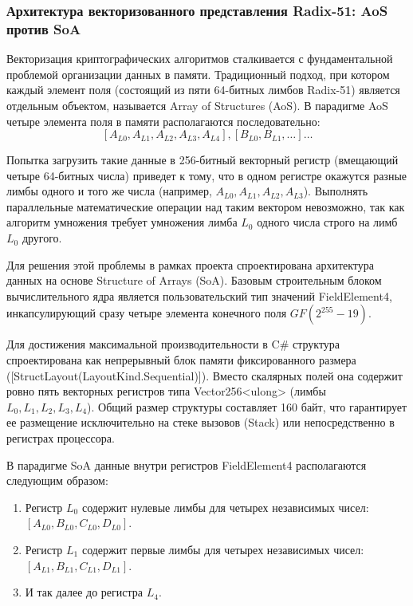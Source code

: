 \subsubsection{Архитектура векторизованного представления Radix-51: AoS против SoA}

Векторизация криптографических алгоритмов сталкивается с фундаментальной проблемой организации данных в памяти. 
Традиционный подход, при котором каждый элемент поля (состоящий из пяти 64-битных лимбов Radix-51) является отдельным объектом, называется Array of Structures (AoS). В парадигме AoS четыре элемента поля в памяти располагаются последовательно:
$$[A_{L0}, A_{L1}, A_{L2}, A_{L3}, A_{L4}], [B_{L0}, B_{L1}, \dots] \dots $$

Попытка загрузить такие данные в 256-битный векторный регистр (вмещающий четыре 64-битных числа) приведет к тому, что в одном регистре окажутся разные лимбы одного и того же числа (например, $A_{L0}, A_{L1}, A_{L2}, A_{L3}$). Выполнять параллельные математические операции над таким вектором невозможно, так как алгоритм умножения требует умножения лимба $L_0$ одного числа строго на лимб $L_0$ другого.

Для решения этой проблемы в рамках проекта спроектирована архитектура данных на основе Structure of Arrays (SoA). Базовым строительным блоком вычислительного ядра является пользовательский тип значений FieldElement4, инкапсулирующий сразу четыре элемента конечного поля $GF(2^{255}-19)$.

Для достижения максимальной производительности в C\# структура спроектирована как непрерывный блок памяти фиксированного размера ([StructLayout(LayoutKind.Sequential)]). Вместо скалярных полей она содержит ровно пять векторных регистров типа Vector256<ulong> (лимбы $L_0, L_1, L_2, L_3, L_4$). Общий размер структуры составляет 160 байт, что гарантирует ее размещение исключительно на стеке вызовов (Stack) или непосредственно в регистрах процессора.

В парадигме SoA данные внутри регистров FieldElement4 располагаются следующим образом:
\begin{enumerate}
    \item Регистр $L_0$ содержит нулевые лимбы для четырех независимых чисел: $[A_{L0}, B_{L0}, C_{L0}, D_{L0}]$.
    \item Регистр $L_1$ содержит первые лимбы для четырех независимых чисел: $[A_{L1}, B_{L1}, C_{L1}, D_{L1}]$.
    \item И так далее до регистра $L_4$.
\end{enumerate}

